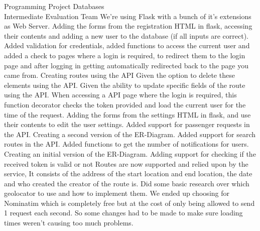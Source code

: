 \documentclass{article}
\newcounter{team}
\begin{document}
\begin{Minutes}{Programming Project Databases \\ Intermediate Evaluation Team }
    	        We're using Flask with a bunch of it's extensions as Web Server.
    			    Adding the forms from the registration HTML in flask, accessing their contents and adding a new user to the database (if all inputs are correct).
    			    Added validation for credentials, added functions to access the current user and added a check to pages where a login is required, to redirect them to the login page and after logging in getting automatically redirected back to the page you came from.
    			    Creating routes using the API
    			    Given the option to delete these elements using the API.
    			    Given the ability to update specific fields of the route using the API.
    			    When accessing a API page where the login is required, this function decorator checks the token provided and load the current user for the time of the request.
    			    Adding the forms from the settings HTML in flask, and use their contents to edit the user settings.
    			    Added support for passenger requests in the API.
    			    Creating a second version of the ER-Diagram.
    			    Added support for search routes in the API.
    			    Added functions to get the number of notifications for users.
    			    Creating an initial version of the ER-Diagram.
    			    Adding support for checking if the received token is valid or not
    			    Routes are now supported and relied upon by the service, It consists of the address of the start location and end location, the date and who created the creator of the route is.
    			    Did some basic research over which geolocator to use and how to implement them. We ended up choosing for Nominatim which is completely free but at the cost of only being allowed to send 1 request each second. So some changes had to be made to make sure loading times weren't causing too much problems.



\end{Minutes}
\end{document}
